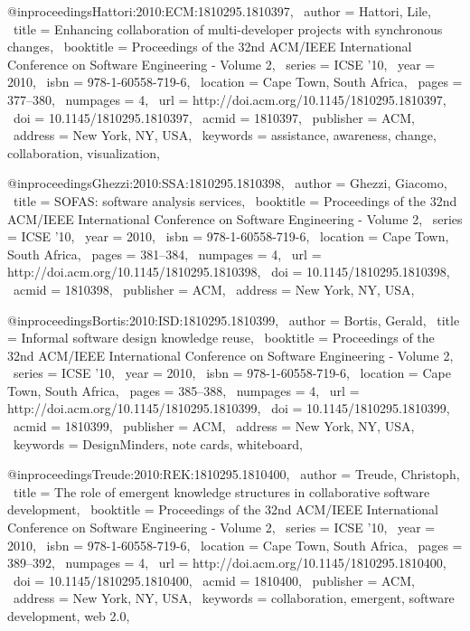 @inproceedings{Hattori:2010:ECM:1810295.1810397,
 author = {Hattori, Lile},
 title = {Enhancing collaboration of multi-developer projects with synchronous changes},
 booktitle = {Proceedings of the 32nd ACM/IEEE International Conference on Software Engineering - Volume 2},
 series = {ICSE '10},
 year = {2010},
 isbn = {978-1-60558-719-6},
 location = {Cape Town, South Africa},
 pages = {377--380},
 numpages = {4},
 url = {http://doi.acm.org/10.1145/1810295.1810397},
 doi = {10.1145/1810295.1810397},
 acmid = {1810397},
 publisher = {ACM},
 address = {New York, NY, USA},
 keywords = {assistance, awareness, change, collaboration, visualization},
} 

@inproceedings{Ghezzi:2010:SSA:1810295.1810398,
 author = {Ghezzi, Giacomo},
 title = {SOFAS: software analysis services},
 booktitle = {Proceedings of the 32nd ACM/IEEE International Conference on Software Engineering - Volume 2},
 series = {ICSE '10},
 year = {2010},
 isbn = {978-1-60558-719-6},
 location = {Cape Town, South Africa},
 pages = {381--384},
 numpages = {4},
 url = {http://doi.acm.org/10.1145/1810295.1810398},
 doi = {10.1145/1810295.1810398},
 acmid = {1810398},
 publisher = {ACM},
 address = {New York, NY, USA},
} 

@inproceedings{Bortis:2010:ISD:1810295.1810399,
 author = {Bortis, Gerald},
 title = {Informal software design knowledge reuse},
 booktitle = {Proceedings of the 32nd ACM/IEEE International Conference on Software Engineering - Volume 2},
 series = {ICSE '10},
 year = {2010},
 isbn = {978-1-60558-719-6},
 location = {Cape Town, South Africa},
 pages = {385--388},
 numpages = {4},
 url = {http://doi.acm.org/10.1145/1810295.1810399},
 doi = {10.1145/1810295.1810399},
 acmid = {1810399},
 publisher = {ACM},
 address = {New York, NY, USA},
 keywords = {DesignMinders, note cards, whiteboard},
} 

@inproceedings{Treude:2010:REK:1810295.1810400,
 author = {Treude, Christoph},
 title = {The role of emergent knowledge structures in collaborative software development},
 booktitle = {Proceedings of the 32nd ACM/IEEE International Conference on Software Engineering - Volume 2},
 series = {ICSE '10},
 year = {2010},
 isbn = {978-1-60558-719-6},
 location = {Cape Town, South Africa},
 pages = {389--392},
 numpages = {4},
 url = {http://doi.acm.org/10.1145/1810295.1810400},
 doi = {10.1145/1810295.1810400},
 acmid = {1810400},
 publisher = {ACM},
 address = {New York, NY, USA},
 keywords = {collaboration, emergent, software development, web 2.0},
} 


